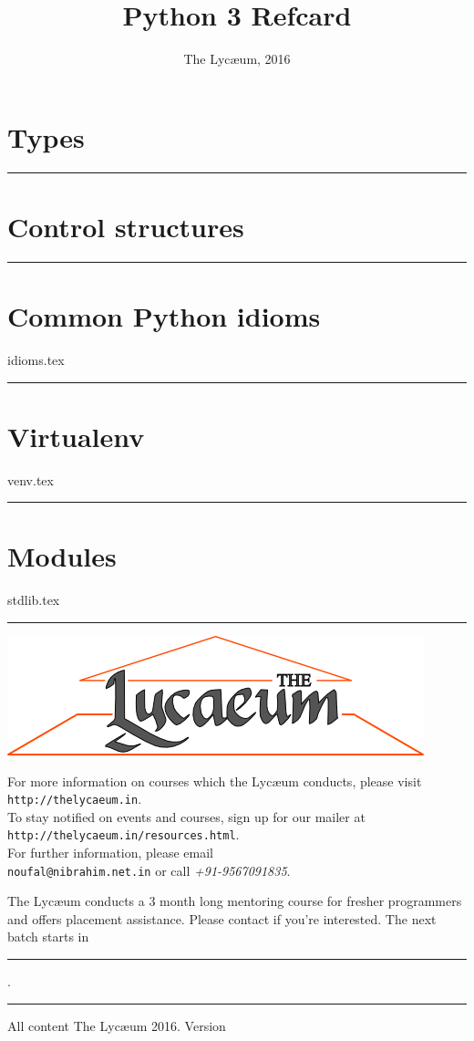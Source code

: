\documentclass{refsheet}
\title{Python 3 Refcard}
\author{The Lyc\ae{}um, 2016}
\date{}
\begin{document}
\maketitle
\section{Types}







\noindent\rule{\linewidth}{0.05ex}
\section{Control structures}







\noindent\rule{\linewidth}{0.05ex}
\section{Common Python idioms}
 {idioms.tex}

\noindent\rule{\linewidth}{0.05ex}
\section{Virtualenv}
 {venv.tex}

\noindent\rule{\linewidth}{0.05ex}
\section{Modules}
 {stdlib.tex}

\noindent\rule{\linewidth}{0.05ex}
\begin{center}
\includegraphics[scale=0.4]{images/parthenon-callig.png}
\end{center}
For more information on courses which the Lyc\ae{}um conducts, please
visit \texttt{http://thelycaeum.in}. \\To stay notified on events and
courses, sign up for our mailer at \texttt{http://thelycaeum.in/resources.html}. \\For further
information, please email \\\texttt{noufal@nibrahim.net.in} or call
\textit{+91-9567091835}.
\vspace{0.5cm}

The Lyc\ae{}um conducts a 3 month long mentoring course for fresher
programmers and offers placement assistance. Please contact if you're
interested. The next batch starts in \rule{4cm}{0.1ex}.

    \textcolor{lightgray}{\noindent\rule{\linewidth}{0.05ex}}
\footnotesize All content \textcopyright The Lyc\ae{}um 2016. Version 
\end{document}

